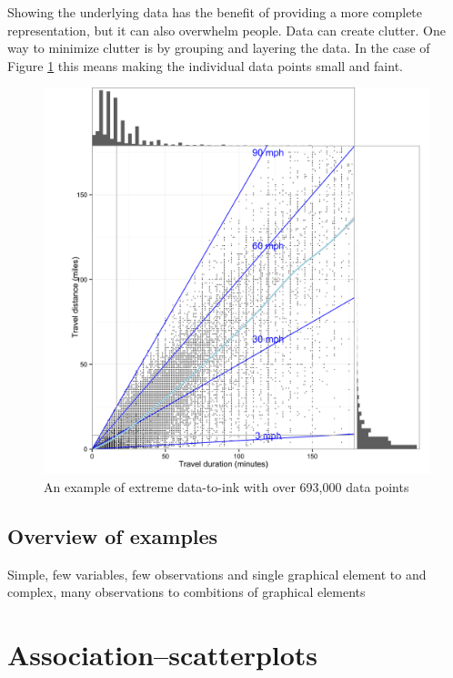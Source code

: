 \documentclass[]{krantz}
\theoremstyle{definition}
\theoremstyle{definition}
\theoremstyle{definition}
\theoremstyle{remark}
\begin{document}
Showing the underlying data has the benefit of providing a more complete
representation, but it can also overwhelm people. Data can create
clutter. One way to minimize clutter is by grouping and layering the
data. In the case of Figure \ref{fig:trip-dur} this means making the
individual data points small and faint.

\begin{figure}
\includegraphics[width=66.67in]{images/Trip_Dist_Dur} \caption{An example of extreme data-to-ink with over 693,000 data points}\label{fig:trip-dur}
\end{figure}

\section{Overview of examples}\label{overview-of-examples}

Simple, few variables, few observations and single graphical element to
and complex, many observations to combitions of graphical elements

\cleardoublepage 

\chapter{Association--scatterplots}\label{Association}
\end{document}
